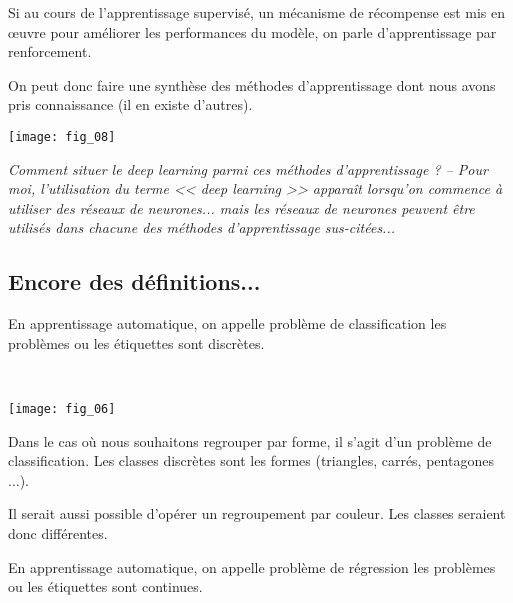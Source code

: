 \begin{defi}
Si au cours de l'apprentissage supervisé, un mécanisme de récompense est mis en \oe{}uvre pour améliorer les performances du modèle, on parle d'apprentissage par renforcement.
\end{defi}



On peut donc faire une synthèse des méthodes d'apprentissage dont nous avons pris connaissance (il en existe d'autres).

\begin{center}
\texttt{[image: fig\_08]}
\end{center}

\textit{Comment situer le deep learning parmi ces méthodes d'apprentissage ? --  Pour moi,  l'utilisation du terme << deep learning >> apparaît lorsqu'on commence à utiliser des réseaux de neurones... mais les réseaux de neurones peuvent être utilisés dans chacune des méthodes d'apprentissage sus-citées...}

\subsection{Encore des définitions...}

\begin{defi}[Classification]
En apprentissage automatique, on appelle problème de classification les problèmes ou les étiquettes sont discrètes.
\end{defi}

\begin{exemple} ~\\

\begin{center}
\texttt{[image: fig\_06]}
\end{center}

Dans le cas où nous souhaitons regrouper par forme, il s'agit d'un problème de classification. Les classes discrètes sont les formes (triangles, carrés, pentagones ...). 

Il serait aussi possible d'opérer un regroupement par couleur. Les classes seraient donc différentes.
\end{exemple}

\begin{defi}[Régression]
En apprentissage automatique, on appelle problème de régression les problèmes ou les étiquettes sont continues.
\end{defi}

